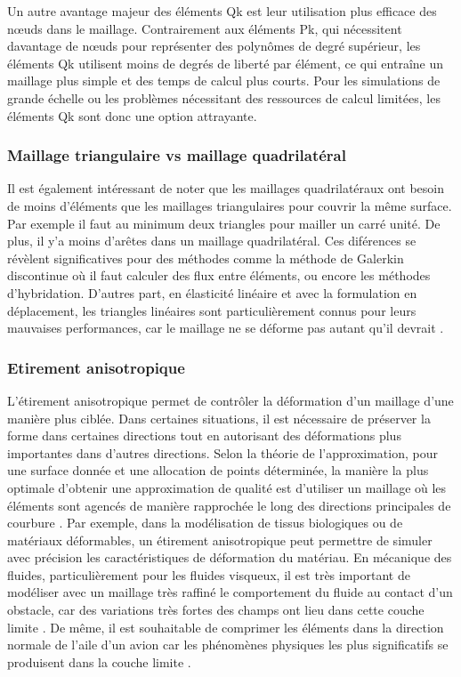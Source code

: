 Un autre avantage majeur des éléments Qk est leur utilisation plus efficace des nœuds dans le maillage. Contrairement aux éléments Pk, qui nécessitent davantage de nœuds pour représenter des polynômes de degré supérieur, les éléments Qk utilisent moins de degrés de liberté par élément, ce qui entraîne un maillage plus simple et des temps de calcul plus courts. Pour les simulations de grande échelle ou les problèmes nécessitant des ressources de calcul limitées, les éléments Qk sont donc une option attrayante.

\subsubsection{Maillage triangulaire vs maillage quadrilatéral}

Il est également intéressant de noter que les maillages quadrilatéraux ont besoin de moins d’éléments que les maillages triangulaires pour couvrir la même surface. Par exemple il faut au minimum deux triangles pour mailler un carré unité. De plus, il y'a moins d'arêtes dans un maillage quadrilatéral. Ces diférences se révèlent significatives pour des méthodes comme la méthode de Galerkin discontinue où il faut calculer des flux entre éléments, ou encore les méthodes d’hybridation. D'autres part, en élasticité linéaire et avec la formulation en déplacement, les triangles linéaires sont particulièrement connus pour leurs mauvaises performances, car le maillage ne se déforme pas autant qu'il devrait \cite{reberol2018maillages}.

\subsubsection{Etirement anisotropique}

L'étirement anisotropique permet de contrôler la déformation d'un maillage d'une manière plus ciblée. Dans certaines situations, il est nécessaire de préserver la forme dans certaines directions tout en autorisant des déformations plus importantes dans d'autres directions. Selon la théorie de l'approximation, pour une surface donnée et une allocation de points déterminée, la manière la plus optimale d'obtenir une approximation de qualité est d'utiliser un maillage où les éléments sont agencés de manière rapprochée le long des directions principales de courbure \cite{d2000bilinear}. Par exemple, dans la modélisation de tissus biologiques ou de matériaux déformables, un étirement anisotropique peut permettre de simuler avec précision les caractéristiques de déformation du matériau. En mécanique des fluides, particulièrement pour les fluides visqueux, il est très important de modéliser avec un maillage très raffiné le comportement du fluide au contact d’un obstacle, car des variations très fortes des champs ont lieu dans cette couche limite \cite{reberol2018maillages}. De même, il est souhaitable de comprimer les éléments dans la direction normale de l'aile d'un avion car les phénomènes physiques les plus significatifs se produisent dans la couche limite \cite{bommes2013quad}.

